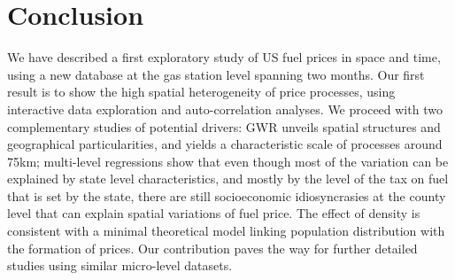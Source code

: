 \documentclass[10pt]{article}
\begin{document}
\section{Conclusion}

We have described a first exploratory study of US fuel prices in space and time, using a new database at the gas station level spanning two months. Our first result is to show the high spatial heterogeneity of price processes, using interactive data exploration and auto-correlation analyses. We proceed with two complementary studies of potential drivers: GWR unveils spatial structures and geographical particularities, and yields a characteristic scale of processes around 75km; multi-level regressions show that even though most of the variation can be explained by state level characteristics, and mostly by the level of the tax on fuel that is set by the state, there are still socioeconomic idiosyncrasies at the county level that can explain spatial variations of fuel price. The effect of density is consistent with a minimal theoretical model linking population distribution with the formation of prices. Our contribution paves the way for further detailed studies using similar micro-level datasets.
\end{document}
